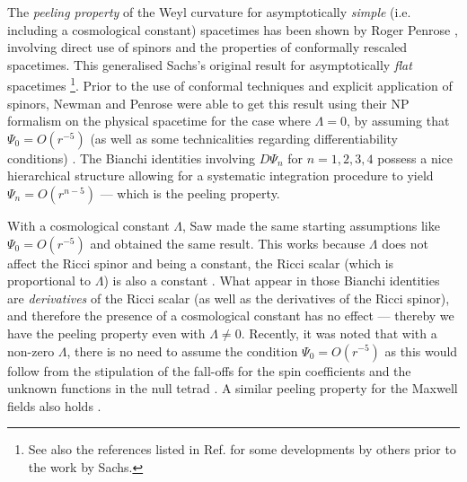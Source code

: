 \documentclass[aps,pre,preprint,superscriptaddress,showpacs,showkeys]{revtex4-1}
\begin{document}
The \emph{peeling property} of the Weyl curvature for asymptotically \emph{simple} (i.e. including a cosmological constant) spacetimes has been shown by Roger Penrose \cite{Pen65,Pen88}, involving direct use of spinors and the properties of conformally rescaled spacetimes. This generalised Sachs's original result for asymptotically \emph{flat} spacetimes \cite{Sachs61} \footnote{See also the references listed in Ref. \cite{Sachs61} for some developments by others prior to the work by Sachs.}. Prior to the use of conformal techniques and explicit application of spinors, Newman and Penrose were able to get this result using their NP formalism on the physical spacetime for the case where $\Lambda=0$, by assuming that $\Psi_0=O(r^{-5})$ (as well as some technicalities regarding differentiability conditions) \cite{newpen62}. The Bianchi identities involving $D\Psi_n$ for $n=1,2,3,4$ possess a nice hierarchical structure allowing for a systematic integration procedure to yield $\Psi_n=O(r^{n-5})$ --- which is the peeling property.

With a cosmological constant $\Lambda$, Saw \cite{Vee2016} made the same starting assumptions like $\Psi_0=O(r^{-5})$ and obtained the same result. This works because $\Lambda$ does not affect the Ricci spinor and being a constant, the Ricci scalar (which is proportional to $\Lambda$) is also a constant \cite{Don}. What appear in those Bianchi identities are \emph{derivatives} of the Ricci scalar (as well as the derivatives of the Ricci spinor), and therefore the presence of a cosmological constant has no effect --- thereby we have the peeling property even with $\Lambda\neq0$. Recently, it was noted that with a non-zero $\Lambda$, there is no need to assume the condition $\Psi_0=O(r^{-5})$ as this would follow from the stipulation of the fall-offs for the spin coefficients and the unknown functions in the null tetrad \cite{Vee2017c}. A similar peeling property for the Maxwell fields also holds \cite{Vee2017}.
\end{document}

